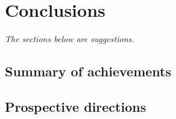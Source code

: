 \chapter{Conclusions}

\begin{minipage}[c]{0.95\textwidth}
	\textit{The sections below are suggestions.}
\end{minipage}



\section{Summary of achievements}


\section{Prospective directions}

